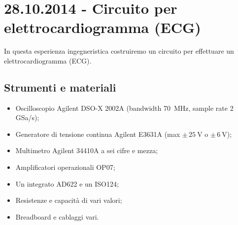\section{28.10.2014 - Circuito per elettrocardiogramma (ECG)}

In questa esperienza ingegneristica costruiremo un circuito per effettuare un elettrocardiogramma (ECG).

\subsection*{Strumenti e materiali}

\begin{itemize} [noitemsep]
	\item Oscilloscopio Agilent DSO-X 2002A (bandwidth \SI{70}{\mega\hertz}, sample rate \num{2} GSa/s);%
		\item Generatore di tensione continua Agilent E3631A (max $\pm \, \SI{25}{\volt}$ o $\pm \, \SI{6}{\volt}$);
		\item Multimetro Agilent 34410A a sei cifre e mezza;
		\item Amplificatori operazionali OP07;
		\item Un integrato AD622 e un ISO124;
		\item Resistenze e capacità di vari valori;
		\item Breadboard e cablaggi vari.
\end{itemize}
